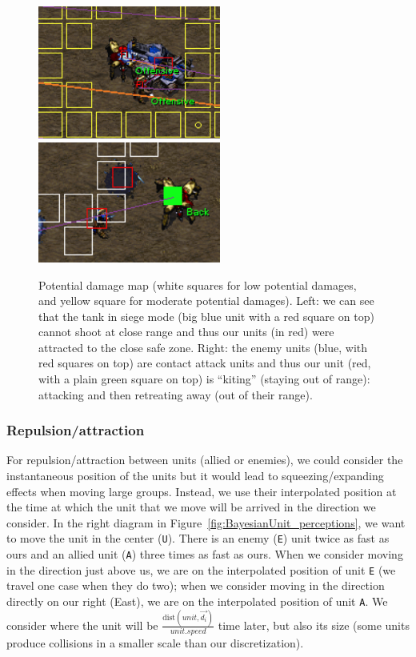 \begin{figure}[h]
\begin{center}
\includegraphics[width=6cm]{images/tank_cac.png}
\hspace{1cm}
\includegraphics[width=6cm]{images/kiting.png}
\caption{Potential damage map (white squares for low potential damages, and yellow square for moderate potential damages). Left: we can see that the tank in siege mode (big blue unit with a red square on top) cannot shoot at close range and thus our units (in red) were attracted to the close safe zone. Right: the enemy units (blue, with red squares on top) are contact attack units and thus our unit (red, with a plain green square on top) is ``kiting'' (staying out of range): attacking and then retreating away (out of their range).}
\end{center}
\label{fig:potential_damage_map}
\end{figure}

\subsubsection{Repulsion/attraction}
\label{sec:microrepulsionattraction}
For repulsion/attraction between units (allied or enemies), we could consider the instantaneous position of the units but it would lead to squeezing/expanding effects when moving large groups. Instead, we use their interpolated position at the time at which the unit that we move will be arrived in the direction we consider. In the right diagram in Figure~\ref{fig:BayesianUnit_perceptions}, we want to move the unit in the center (\texttt{U}). There is an enemy (\texttt{E}) unit twice as fast as ours and an allied unit (\texttt{A}) three times as fast as ours. When we consider moving in the direction just above us, we are on the interpolated position of unit \texttt{E} (we travel one case when they do two); when we consider moving in the direction directly on our right (East), we are on the interpolated position of unit \texttt{A}. 
We consider where the unit will be $\frac{\mathrm{dist}(unit, \vec{d_i})}{unit.speed}$ time later, but also its size (some units produce collisions in a smaller scale than our discretization).

